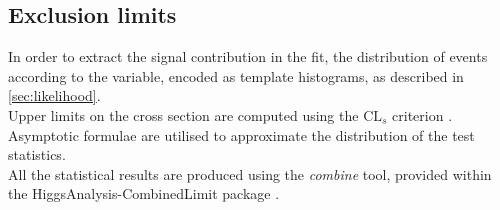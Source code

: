 %
%
%
%
\subsection{Exclusion limits}
\label{sec:susy_results}

In order to extract the signal contribution in the fit, the distribution of events according to the \mht variable, 
encoded as template histograms, as described in \ref{sec:likelihood}. \\
Upper limits on the cross section are computed using the $\text{CL}_{s}$ criterion \cite{CLsTechnique}. 
Asymptotic formulae \cite{AsymptoticFormulae} are utilised to approximate the distribution of the test statistics. \\
All the statistical results are produced using the \textit{combine} tool, 
provided within the HiggsAnalysis-CombinedLimit package \cite{Combine}. 

